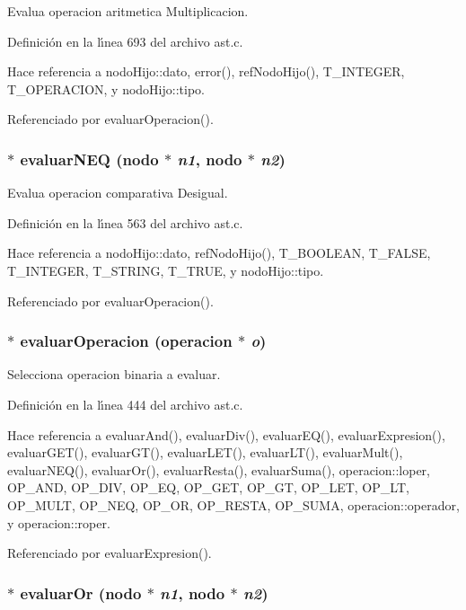 Evalua operacion aritmetica Multiplicacion. 



Definici\'{o}n en la l\'{\i}nea 693 del archivo ast.c.

Hace referencia a nodo\-Hijo::dato, error(), ref\-Nodo\-Hijo(), T\_\-INTEGER, T\_\-OPERACION, y nodo\-Hijo::tipo.

Referenciado por evaluar\-Operacion().
\subsubsection{$\ast$ evaluar\-NEQ ({\bf nodo} $\ast$ {\em n1}, {\bf nodo} $\ast$ {\em n2})}\label{ast_8c_a30}


Evalua operacion comparativa Desigual. 



Definici\'{o}n en la l\'{\i}nea 563 del archivo ast.c.

Hace referencia a nodo\-Hijo::dato, ref\-Nodo\-Hijo(), T\_\-BOOLEAN, T\_\-FALSE, T\_\-INTEGER, T\_\-STRING, T\_\-TRUE, y nodo\-Hijo::tipo.

Referenciado por evaluar\-Operacion().
\subsubsection{$\ast$ evaluar\-Operacion ({\bf operacion} $\ast$ {\em o})}\label{ast_8c_a26}


Selecciona operacion binaria a evaluar. 



Definici\'{o}n en la l\'{\i}nea 444 del archivo ast.c.

Hace referencia a evaluar\-And(), evaluar\-Div(), evaluar\-EQ(), evaluar\-Expresion(), evaluar\-GET(), evaluar\-GT(), evaluar\-LET(), evaluar\-LT(), evaluar\-Mult(), evaluar\-NEQ(), evaluar\-Or(), evaluar\-Resta(), evaluar\-Suma(), operacion::loper, OP\_\-AND, OP\_\-DIV, OP\_\-EQ, OP\_\-GET, OP\_\-GT, OP\_\-LET, OP\_\-LT, OP\_\-MULT, OP\_\-NEQ, OP\_\-OR, OP\_\-RESTA, OP\_\-SUMA, operacion::operador, y operacion::roper.

Referenciado por evaluar\-Expresion().
\subsubsection{$\ast$ evaluar\-Or ({\bf nodo} $\ast$ {\em n1}, {\bf nodo} $\ast$ {\em n2})}\label{ast_8c_a28}


